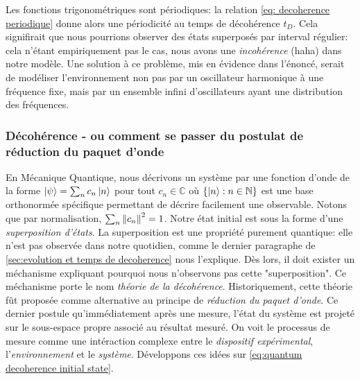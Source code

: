 \documentclass[11pt,oneside,a4paper]{article}
\begin{document}
Les fonctions trigonométriques sont périodiques: la relation \eqref{eq: decoherence periodique} donne alors une périodicité au temps de décohérence $t_D$. Cela signifirait que nous pourrions observer des états superposés par interval régulier: cela n'étant empiriquement pas le cas, nous avons une \emph{incohérence} (haha) dans notre modèle. Une solution à ce problème, mis en évidence dans l'énoncé, serait de modéliser l'environnement non pas par un oscillateur harmonique à une fréquence fixe, mais par un ensemble infini d'oscillateurs ayant une distribution des fréquences.\\

\subsubsection{Décohérence - ou comment se passer du postulat de réduction du paquet d'onde}

En Mécanique Quantique, nous décrivons un système par une fonction d'onde de la forme $\ket{\psi} = \sum_n c_n\ket{n}$ pour tout $c_n\in\mathbb{C}$ où $\left\{\ket{n} : n\in\mathbb{N}\right\}$ est une base orthonormée spécifique permettant de décrire facilement une observable. Notons que par normalisation, $\sum_n \norm{c_n}^2 = 1$. Notre état initial est sous la forme d'une \emph{superposition d'états}. La superposition est une propriété purement quantique: elle n'est pas observée dans notre quotidien, comme le dernier paragraphe de \ref{sec:evolution et temps de decoherence} nous l'explique. Dès lors, il doit exister un méchanisme expliquant pourquoi nous n'observons pas cette "superposition". Ce méchanisme porte le nom \emph{théorie de la décohérence}. Historiquement, cette théorie fût proposée comme alternative au principe de \emph{réduction du paquet d'onde}. Ce dernier postule qu'immédiatement après une mesure, l'état du système est projeté sur le sous-espace propre associé au résultat mesuré. On voit le processus de mesure comme une intéraction complexe entre le \emph{dispositif expérimental}, l'\emph{environnement} et le \emph{système}. Développons ces idées sur \eqref{eq:quantum decoherence initial state}.\\
\end{document}
